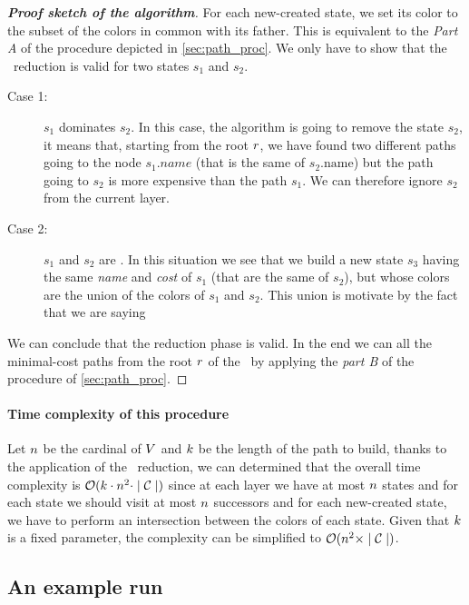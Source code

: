 \begin{proof}[\normalfont\textbf{Proof sketch of the algorithm}]
  For each new-created state, we set its color to the subset of the colors in common with its father. This is equivalent to the \textit{Part A} of the procedure depicted in \cref{sec:path_proc}. We only have to show that the \mdd\ reduction is valid for two states $s_1$ and $s_2$.
  \begin{description}
    \item[Case 1:] $s_1$ dominates $s_2$. In this case, the algorithm is going to remove the state $s_2$, it means that, starting from the root $r$, we have found two different paths going to the node $s_1\textit{.name}$ (that is the same of $s_2\text{.name}$) but the path going to $s_2$ is more expensive than the path $s_1$. We can therefore ignore $s_2$ from the current layer.
    \item[Case 2:] $s_1$ and $s_2$ are \compatibleState. In this situation we see that we build a new state $s_3$ having the same \textit{name} and \textit{cost} of $s_1$ (that are the same of $s_2$), but whose colors are the union of the colors of $s_1$ and $s_2$. This union is motivate by the fact that we are saying 
  \end{description}
  We can conclude that the reduction phase is valid. In the end we can all the minimal-cost paths from the root $r$ of the \mdd\ by applying the \textit{part B} of the procedure of \cref{sec:path_proc}.
\end{proof}

\paragraph{Time complexity of this procedure} Let $n$ be the cardinal of $V$ and $k$ be the length of the path to build, thanks to the application of the \mdd\ reduction, we can determined that the overall time complexity is $\mathcal{O}(k \cdot n^2 \cdot \mid \mathcal{C} \mid)$ since at each layer we have at most $n$ states and for each state we should visit at most $n$ successors and for each new-created state, we have to perform an intersection between the colors of each state. Given that $k$ is a fixed parameter, the complexity can be simplified to $\mathcal{O}(n^2 \times \mid \mathcal{C} \mid)$.

\subsection{An example run}

